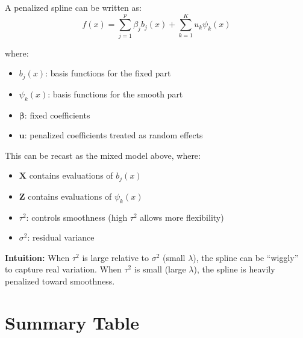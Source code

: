 \documentclass[11pt]{article}
\begin{document}
A penalized spline can be written as:
\begin{equation}
f(x) = \sum_{j=1}^p \beta_j b_j(x) + \sum_{k=1}^K u_k \psi_k(x)
\end{equation}

where:
\begin{itemize}
    \item $b_j(x)$: basis functions for the fixed part
    \item $\psi_k(x)$: basis functions for the smooth part
    \item $\boldsymbol{\beta}$: fixed coefficients
    \item $\mathbf{u}$: penalized coefficients treated as random effects
\end{itemize}

This can be recast as the mixed model above, where:
\begin{itemize}
    \item $\mathbf{X}$ contains evaluations of $b_j(x)$
    \item $\mathbf{Z}$ contains evaluations of $\psi_k(x)$
    \item $\tau^2$: controls smoothness (high $\tau^2$ allows more flexibility)
    \item $\sigma^2$: residual variance
\end{itemize}

\textbf{Intuition:} When $\tau^2$ is large relative to $\sigma^2$ (small $\lambda$), the spline can be ``wiggly'' to capture real variation. When $\tau^2$ is small (large $\lambda$), the spline is heavily penalized toward smoothness.

\section{Summary Table}
\end{document}
